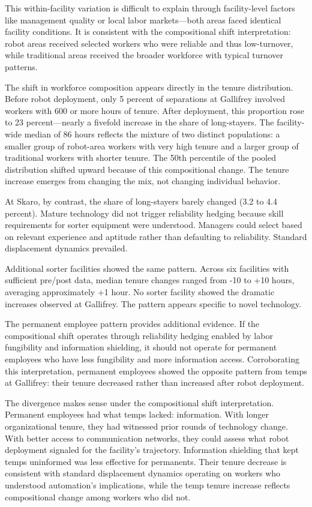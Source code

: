 \documentclass[12pt]{article}
\begin{document}
This within-facility variation is difficult to explain through facility-level factors like management quality or local labor markets---both areas faced identical facility conditions. It is consistent with the compositional shift interpretation: robot areas received selected workers who were reliable and thus low-turnover, while traditional areas received the broader workforce with typical turnover patterns.

The shift in workforce composition appears directly in the tenure distribution. Before robot deployment, only 5 percent of separations at Gallifrey involved workers with 600 or more hours of tenure. After deployment, this proportion rose to 23 percent---nearly a fivefold increase in the share of long-stayers. The facility-wide median of 86 hours reflects the mixture of two distinct populations: a smaller group of robot-area workers with very high tenure and a larger group of traditional workers with shorter tenure. The 50th percentile of the pooled distribution shifted upward because of this compositional change. The tenure increase emerges from changing the mix, not changing individual behavior.

At Skaro, by contrast, the share of long-stayers barely changed (3.2 to 4.4 percent). Mature technology did not trigger reliability hedging because skill requirements for sorter equipment were understood. Managers could select based on relevant experience and aptitude rather than defaulting to reliability. Standard displacement dynamics prevailed.

Additional sorter facilities showed the same pattern. Across six facilities with sufficient pre/post data, median tenure changes ranged from -10 to +10 hours, averaging approximately +1 hour. No sorter facility showed the dramatic increases observed at Gallifrey. The pattern appears specific to novel technology.

The permanent employee pattern provides additional evidence. If the compositional shift operates through reliability hedging enabled by labor fungibility and information shielding, it should not operate for permanent employees who have less fungibility and more information access. Corroborating this interpretation, permanent employees showed the opposite pattern from temps at Gallifrey: their tenure decreased rather than increased after robot deployment.

The divergence makes sense under the compositional shift interpretation. Permanent employees had what temps lacked: information. With longer organizational tenure, they had witnessed prior rounds of technology change. With better access to communication networks, they could assess what robot deployment signaled for the facility's trajectory. Information shielding that kept temps uninformed was less effective for permanents. Their tenure decrease is consistent with standard displacement dynamics operating on workers who understood automation's implications, while the temp tenure increase reflects compositional change among workers who did not.
\end{document}
